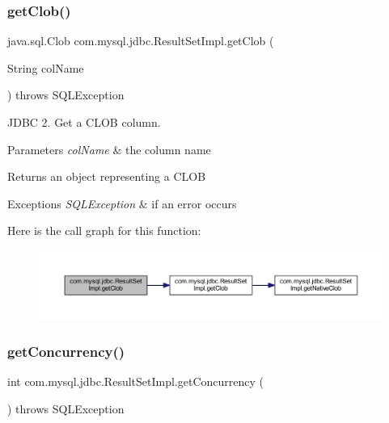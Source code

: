 \subsubsection{\texorpdfstring{get\+Clob()}{getClob()}\hspace{0.1cm}{\footnotesize\ttfamily [2/2]}}
{\footnotesize\ttfamily java.\+sql.\+Clob com.\+mysql.\+jdbc.\+Result\+Set\+Impl.\+get\+Clob (\begin{DoxyParamCaption}\item[{String}]{col\+Name }\end{DoxyParamCaption}) throws S\+Q\+L\+Exception}

J\+D\+BC 2. Get a C\+L\+OB column.


\begin{DoxyParams}{Parameters}
{\em col\+Name} & the column name\\
\hline
\end{DoxyParams}
\begin{DoxyReturn}{Returns}
an object representing a C\+L\+OB
\end{DoxyReturn}

\begin{DoxyExceptions}{Exceptions}
{\em S\+Q\+L\+Exception} & if an error occurs \\
\hline
\end{DoxyExceptions}
Here is the call graph for this function\+:
\nopagebreak
\begin{figure}[H]
\begin{center}
\leavevmode
\includegraphics[width=350pt]{classcom_1_1mysql_1_1jdbc_1_1_result_set_impl_a69deb5487ef64b397460ff4fdea4c13d_cgraph}
\end{center}
\end{figure}
\mbox{\label{classcom_1_1mysql_1_1jdbc_1_1_result_set_impl_ad09f056bbe0879d38d3f57b999083fb5}} 
\subsubsection{\texorpdfstring{get\+Concurrency()}{getConcurrency()}}
{\footnotesize\ttfamily int com.\+mysql.\+jdbc.\+Result\+Set\+Impl.\+get\+Concurrency (\begin{DoxyParamCaption}{ }\end{DoxyParamCaption}) throws S\+Q\+L\+Exception}

